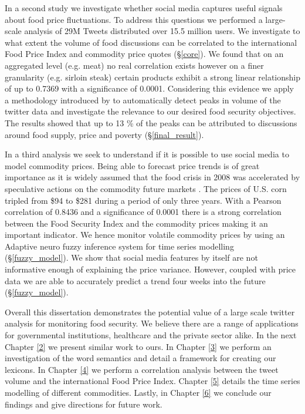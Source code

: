 In a second study we investigate whether social media captures useful signals about food price fluctuations. To address this questions we performed a large-scale analysis of 29M Tweets distributed over 15.5 million users. We investigate to what extent the volume of food discussions can be correlated to the international Food Price Index and commodity price quotes (\S\ref{core}). We found that on an aggregated level (e.g. meat) no real correlation exists however on a finer granularity (e.g. sirloin steak) certain products exhibit a strong linear relationship of up to 0.7369 with a significance of 0.0001. Considering this evidence we apply a methodology introduced by \cite{olt15} to automatically detect peaks in volume of the twitter data and investigate the relevance to our desired food security objectives. The results showed that up to 13 \% of the peaks can be attributed to discussions around food supply, price and poverty (\S\ref{final_result}). 

In a third analysis we seek to understand if it is possible to use social media to model commodity prices. Being able to forecast price trends is of great importance as it is widely assumed that  the food crisis in 2008 was accelerated by speculative actions on the commodity future markets \cite{foodwatch}. The prices of U.S. corn tripled from \$94 to \$281 during a period of only three years. With a Pearson correlation of 0.8436 and a significance of 0.0001 there is a strong correlation  between the Food Security Index and the commodity prices making it an important indicator. We hence monitor volatile commodity prices by using an Adaptive neuro fuzzy inference system for time series modelling (\S\ref{fuzzy_model}). We show that social media features by itself are not informative enough of explaining the price variance. However, coupled with price data we are able to accurately predict a trend four weeks into the future (\S\ref{fuzzy_model}). 

Overall this dissertation demonstrates the potential value of a large scale twitter analysis for monitoring food security. We believe there are a range of applications for governmental institutions, healthcare and the private sector alike.  In the next Chapter \ref{2} we present similar work to ours. In Chapter \ref{3} we perform an investigation of the word semantics and detail a framework for creating our lexicons.  In Chapter \ref{4} we perform a correlation analysis between the tweet volume and the international Food Price Index. Chapter \ref{5} details the time series modelling of different commodities. Lastly, in Chapter \ref{6} we conclude our findings and give directions for future work. 





